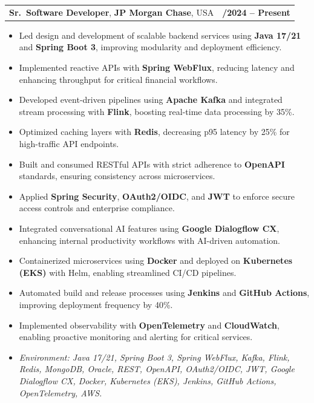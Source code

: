 \documentclass[letterpaper,11pt]{article}
\makeatletter
\newcommand{\resumeItem}[1]{
  \item\footnotesize{
    {#1 \vspace{-2pt}}
  }
}
\newcommand{\resumeSubheading}[4]{
  \vspace{-2pt}\item
    \begin{tabular*}{1.0\textwidth}[t]{l@{\extracolsep{\fill}}r}
      \textbf{\fontsize{10pt}{14pt}\selectfont #3}, \textbf{\fontsize{10pt}{14pt}\selectfont #1}, \fontsize{10pt}{14pt}\selectfont #4 & \textbf{\fontsize{10pt}{14pt}\selectfont #2} \\
    \end{tabular*}\vspace{-7pt}
}
\newcommand{\resumeItemListStart}{\begin{itemize}[leftmargin=*]}
\newcommand{\resumeItemListEnd}{\end{itemize}\vspace{-5pt}}
\makeatother
\begin{document}
\resumeSubheading
{JP Morgan Chase}{09/2024 -- Present}
{Sr.\ Software Developer}{USA}
\resumeItemListStart
  \resumeItem{Led design and development of scalable backend services using \textbf{Java 17/21} and \textbf{Spring Boot 3}, improving modularity and deployment efficiency.}
  \resumeItem{Implemented reactive APIs with \textbf{Spring WebFlux}, reducing latency and enhancing throughput for critical financial workflows.}
  \resumeItem{Developed event-driven pipelines using \textbf{Apache Kafka} and integrated stream processing with \textbf{Flink}, boosting real-time data processing by 35\%.}
  \resumeItem{Optimized caching layers with \textbf{Redis}, decreasing p95 latency by 25\% for high-traffic API endpoints.}
  \resumeItem{Built and consumed RESTful APIs with strict adherence to \textbf{OpenAPI} standards, ensuring consistency across microservices.}
  \resumeItem{Applied \textbf{Spring Security}, \textbf{OAuth2/OIDC}, and \textbf{JWT} to enforce secure access controls and enterprise compliance.}
  \resumeItem{Integrated conversational AI features using \textbf{Google Dialogflow CX}, enhancing internal productivity workflows with AI-driven automation.}
  \resumeItem{Containerized microservices using \textbf{Docker} and deployed on \textbf{Kubernetes (EKS)} with Helm, enabling streamlined CI/CD pipelines.}
  \resumeItem{Automated build and release processes using \textbf{Jenkins} and \textbf{GitHub Actions}, improving deployment frequency by 40\%.}
  \resumeItem{Implemented observability with \textbf{OpenTelemetry} and \textbf{CloudWatch}, enabling proactive monitoring and alerting for critical services.}
  \resumeItem{\textit{Environment: Java 17/21, Spring Boot 3, Spring WebFlux, Kafka, Flink, Redis, MongoDB, Oracle, REST, OpenAPI, OAuth2/OIDC, JWT, Google Dialogflow CX, Docker, Kubernetes (EKS), Jenkins, GitHub Actions, OpenTelemetry, AWS.}}
\resumeItemListEnd
\end{document}
